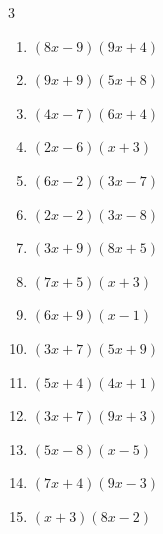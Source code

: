 \begin{multicols}{3}
\begin{enumerate}
\columnbreak %

  \item $(8x-9)(9x+4)$


  \item $(9x+9)(5x+8)$


  \item $(4x-7)(6x+4)$


  \item $(2x-6)(x+3)$


  \item $(6x-2)(3x-7)$


  \item $(2x-2)(3x-8)$


  \item $(3x+9)(8x+5)$


  \item $(7x+5)(x+3)$


  \item $(6x+9)(x-1)$


  \item $(3x+7)(5x+9)$


  \item $(5x+4)(4x+1)$


  \item $(3x+7)(9x+3)$


  \item $(5x-8)(x-5)$


  \item $(7x+4)(9x-3)$


  \item $(x+3)(8x-2)$


\end{enumerate}
\end{multicols}
